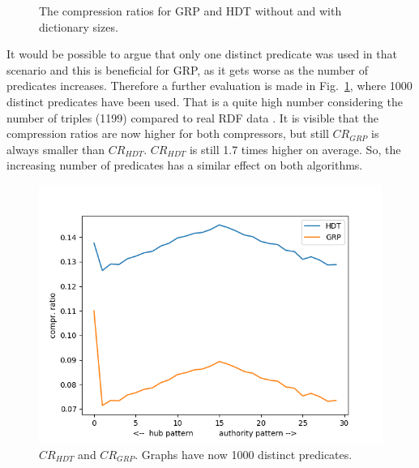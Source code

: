 \begin{figure}[h]
	\centering
	\hfill 
	\caption{The compression ratios for GRP and HDT without and with dictionary sizes.}
\end{figure}

It would be possible to argue that only one distinct predicate was used in that scenario and this is beneficial for GRP, as it gets worse as the number of predicates increases. Therefore a further evaluation is made in Fig.~\ref{fig:bothwithdict1000predicates}, where 1000 distinct predicates have been used. That is a quite high number considering the number of triples (1199) compared to real RDF data . It is visible that the compression ratios are now higher for both compressors, but still $CR_{GRP}$ is always smaller than $CR_{HDT}$. $CR_{HDT}$ is still 1.7 times higher on average. So, the increasing number of predicates has a similar effect on both algorithms.


\begin{figure}
	\centering
	\includegraphics[width=0.7\linewidth]{figures/GRPvsHDT/bothWithDict1000Predicates}
	\caption{$CR_{HDT}$ and $CR_{GRP}$. Graphs have now 1000 distinct predicates.}
	\label{fig:bothwithdict1000predicates}
\end{figure}

